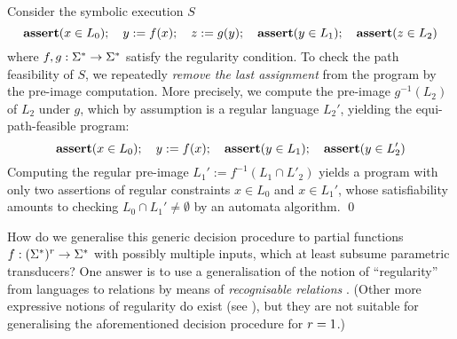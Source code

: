 \begin{example} \label{ex:unif}
    Consider the symbolic execution $S$
    \[
        \textbf{assert}(x \in L_0); \quad y := f(x); \quad z := g(y); 
        \quad \textbf{assert}(y \in L_1); \quad \textbf{assert}(z \in L_2)
    \]
    where $f, g: \Sigma^* \to \Sigma^*$ satisfy the regularity 
    condition. To check the path feasibility of $S$, we repeatedly \emph{remove the last
    assignment} from the program by the pre-image computation. More
    precisely, we compute the pre-image $g^{-1}(L_2)$
    of $L_2$ under $g$, which by assumption is a regular language $L_2'$,
    yielding the equi-path-feasible program:
    \[
        \textbf{assert}(x \in L_0); \quad y := f(x); \quad \textbf{assert}(y \in L_1); \quad  \textbf{assert}(y \in L_2') 
    \]
    Computing the regular pre-image $L_1' := f^{-1}(L_1 \cap L'_2)$ yields
    a program with only two assertions of regular constraints
    $x \in L_0$ and $x \in L_1'$, whose
%
    satisfiability amounts to checking $L_0 \cap L_1' \neq \emptyset$
    by an automata algorithm.
    \qed
\end{example}
How do we generalise this generic decision procedure to partial functions $f: 
(\Sigma^*)^r \to \Sigma^*$ with possibly multiple inputs, which at least
subsume parametric transducers? 
One answer is to use a generalisation of
the notion of ``regularity'' from languages to relations 
by means of \emph{recognisable relations} \cite{choffrut-survey}.
(Other more expressive notions of regularity do exist (see \cite{choffrut-survey}),
but they are not suitable for generalising the aforementioned decision
procedure for $r=1$.)
%

